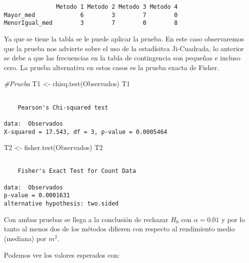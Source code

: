 \documentclass[
  a4paper,
  oneside,
  openany]{book}
\newenvironment{Shaded}{\begin{snugshade}}{\end{snugshade}}
\newcommand{\CommentTok}[1]{\textcolor[rgb]{0.56,0.35,0.01}{\textit{#1}}}
\newcommand{\FunctionTok}[1]{\textcolor[rgb]{0.00,0.00,0.00}{#1}}
\newcommand{\NormalTok}[1]{#1}
\newcommand{\OtherTok}[1]{\textcolor[rgb]{0.56,0.35,0.01}{#1}}
\newcommand{\SpecialCharTok}[1]{\textcolor[rgb]{0.00,0.00,0.00}{#1}}
\begin{document}
\begin{verbatim}
               Metodo 1 Metodo 2 Metodo 3 Metodo 4
Mayor_med             6        3        7        0
MenorIgual_med        3        7        0        8
\end{verbatim}

Ya que se tiene la tabla se le puede aplicar la prueba. En este caso observaremos que la prueba nos advierte sobre el uso de la estadísitca Ji-Cuadrada, lo anterior se debe a que las frecuencias en la tabla de contingencia son pequeñas e incluso cero. La prueba alternativa en estos casos es la prueba exacta de Fisher.

\begin{Shaded}
\begin{Highlighting}[]
\CommentTok{\#Prueba}
\NormalTok{T1 }\OtherTok{\textless{}{-}} \FunctionTok{chisq.test}\NormalTok{(Observados)}
\NormalTok{T1}
\end{Highlighting}
\end{Shaded}

\begin{verbatim}

    Pearson's Chi-squared test

data:  Observados
X-squared = 17.543, df = 3, p-value = 0.0005464
\end{verbatim}

\begin{Shaded}
\begin{Highlighting}[]
\NormalTok{T2 }\OtherTok{\textless{}{-}} \FunctionTok{fisher.test}\NormalTok{(Observados)}
\NormalTok{T2}
\end{Highlighting}
\end{Shaded}

\begin{verbatim}

    Fisher's Exact Test for Count Data

data:  Observados
p-value = 0.0001631
alternative hypothesis: two.sided
\end{verbatim}

Con ambas pruebas se llega a la conclusión de rechazar \(H_0\) con \(\alpha=0.01\) y por lo tanto al menos dos de los métodos difieren con respecto al rendimiento medio (mediana) por \(m^2\).

Podemos ver los valores esperados con:

\begin{Shaded}
\end{Shaded}
\end{document}
